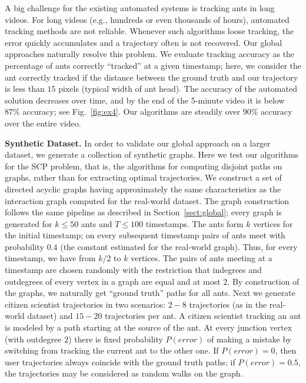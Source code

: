 \documentclass[runningheads]{llncs}
\newcommand{\SCoP}{\textsc{SCP}}
\begin{document}
A big challenge for the existing automated systems is tracking
ants in long videos. For long videos (e.g., hundreds or even thousands
of hours), automated tracking methods are not reliable. Whenever such
algorithms loose tracking, the error quickly accumulates and a
trajectory often is not recovered.
Our global approaches naturally resolve this problem. We evaluate
tracking accuracy as the percentage of ants correctly ``tracked'' at a
given timestamp; here, we consider the ant correctly tracked if the
distance between the ground truth and our trajectory is less than $15$
pixels (typical width of ant head).
The accuracy of the automated solution decreases over time, and by the
end of the 5-minute video it is below $87\%$ accuracy; see
Fig.~\ref{fig:ex4}. Our algorithms are steadily over $90\%$ accuracy
over the entire video.

{\bf Synthetic Dataset.}
In order to validate our global approach on a
larger dataset, we generate a collection of synthetic graphs. 
Here we test our algorithms for the \SCoP{} problem, that is,
the algorithms for computing disjoint paths on graphs, rather than for extracting optimal trajectories.
We construct a set of directed acyclic graphs having approximately the same
characteristics as the interaction graph computed for the real-world dataset.
The graph construction follows the same pipeline as described in Section~\ref{sect:global};
every graph is generated for $k\le 50$ ants and $T\le 100$ timestamps.
The ants form $k$ vertices for the initial timestamp; on every subsequent timestamp
pairs of ants meet with probability $0.4$ (the constant estimated for the real-world graph). Thus,
for every timestamp, we have from $k/2$ to $k$ vertices. The pairs of ants meeting at a timestamp
are chosen randomly with the restriction that indegrees and outdegrees of every vertex
in a graph are equal and at most $2$. By construction of the graphs, we naturally get
``ground truth'' paths for all ants.
Next we generate citizen scientist trajectories in two scenarios: $2-8$ trajectories (as in the real-world dataset) and $15-20$ trajectories per ant. A citizen scientist tracking an ant is modeled by a path starting at the source of the ant. At every junction vertex (with outdegree $2$) there is fixed probability $P(error)$ of making a mistake by switching from tracking the current ant to the other one.
If $P(error)=0$, then user trajectories always coincide with the ground truth paths; if $P(error)=0.5$, the trajectories may be considered as random walks on the graph.
\end{document}
